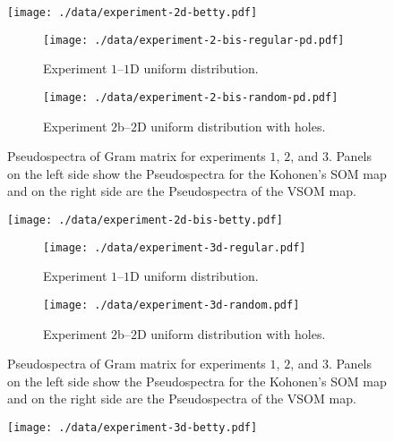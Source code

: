 \documentclass[10pt]{article}
\theoremstyle{definition}
\begin{document}
\begin{figure}[!htpb]
    \centering
    \texttt{[image: ./data/experiment-2d-betty.pdf]}
    \caption{}%
    \label{Fig:betti-2}
\end{figure}


\begin{figure}[!htpb]
     \begin{subfigure}{\textwidth}
         \centering
         \texttt{[image: ./data/experiment-2-bis-regular-pd.pdf]}
         \caption{Experiment $1$--$1$D uniform distribution.}%
         \label{Fig:psa_exp1}
     \end{subfigure}
     \newline 
     \begin{subfigure}{\textwidth}
         \centering
         \texttt{[image: ./data/experiment-2-bis-random-pd.pdf]}
         \caption{Experiment $2$b--$2$D uniform distribution with holes.}%
         \label{Fig:psa_exp2b}
     \end{subfigure}
    \caption{Pseudospectra of Gram matrix for experiments $1$, $2$, and $3$.
    Panels on the left side show the Pseudospectra for the Kohonen's SOM map
    and on the right side are the Pseudospectra of the VSOM map.}%
    \label{Fig:psas}
\end{figure}

\begin{figure}[!htpb]
    \centering
    \texttt{[image: ./data/experiment-2d-bis-betty.pdf]}
    \caption{}%
    \label{Fig:betti-2b}
\end{figure}

\begin{figure}[!htpb]
     \begin{subfigure}{\textwidth}
         \centering
         \texttt{[image: ./data/experiment-3d-regular.pdf]}
         \caption{Experiment $1$--$1$D uniform distribution.}%
         \label{Fig:psa_exp1}
     \end{subfigure}
     \newline 
     \begin{subfigure}{\textwidth}
         \centering
         \texttt{[image: ./data/experiment-3d-random.pdf]}
         \caption{Experiment $2$b--$2$D uniform distribution with holes.}%
         \label{Fig:psa_exp2b}
     \end{subfigure}
    \caption{Pseudospectra of Gram matrix for experiments $1$, $2$, and $3$.
    Panels on the left side show the Pseudospectra for the Kohonen's SOM map
    and on the right side are the Pseudospectra of the VSOM map.}%
    \label{Fig:psas}
\end{figure}

\begin{figure}[!htpb]
    \centering
    \texttt{[image: ./data/experiment-3d-betty.pdf]}
    \caption{}%
    \label{Fig:betti-3}
\end{figure}
\end{document}
